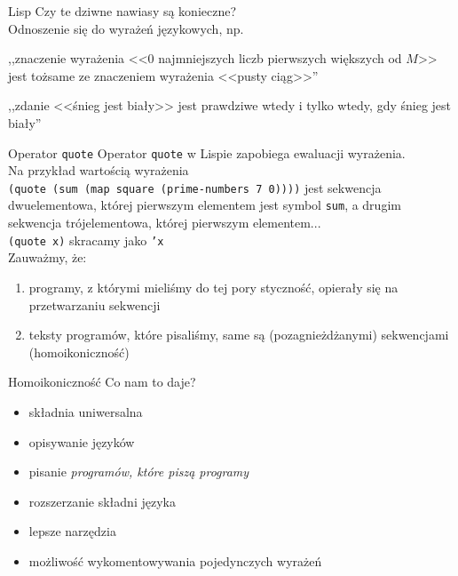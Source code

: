 \documentclass{beamer}
\begin{document}
\begin{frame}{Lisp}
  Czy te dziwne nawiasy są konieczne? \\ \pause
  Odnoszenie się do wyrażeń językowych\pause, np. \\
  \begin{displayquote}
    ,,znaczenie wyrażenia <<$0$ najmniejszych liczb pierwszych
    większych od $M$>> jest tożsame ze znaczeniem wyrażenia <<pusty ciąg>>''
  \end{displayquote} \pause
  \begin{displayquote}
    ,,zdanie <<śnieg jest biały>> jest prawdziwe wtedy i tylko wtedy,
    gdy śnieg jest biały''
  \end{displayquote}
\end{frame}

\begin{frame}{Operator \texttt{quote}}
  Operator \texttt{quote} w Lispie zapobiega ewaluacji wyrażenia. \pause \\
  Na przykład wartością wyrażenia \\
  \texttt{(quote (sum (map square (prime-numbers 7 0))))}
  jest sekwencja dwuelementowa, której pierwszym elementem jest symbol
  \texttt{sum}, a drugim sekwencja trójelementowa, której
  pierwszym elementem...\pause\\
  \texttt{(quote x)} skracamy jako \texttt{'x}\pause\\

  Zauważmy, że:\pause
  \begin{enumerate}
  \item programy, z którymi mieliśmy do tej pory styczność,
    opierały się na przetwarzaniu sekwencji \pause
  \item teksty programów, które pisaliśmy, same są
    (pozagnieżdżanymi) sekwencjami \pause (homoikoniczność)
  \end{enumerate}
\end{frame}

\begin{frame}{Homoikoniczność}
  Co nam to daje? \pause
  \begin{itemize}
  \item składnia uniwersalna\pause
  \item opisywanie języków \pause
  \item pisanie \textit{programów, które piszą programy}\pause
  \item rozszerzanie składni języka \pause
  \item lepsze narzędzia \pause
  \item możliwość wykomentowywania pojedynczych wyrażeń
  \end{itemize}
\end{frame}
\end{document}
